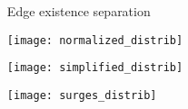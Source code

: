 \documentclass[final]{beamer}
\newlength{\onecolwid}
\newlength{\twocolwid}
\begin{document}
\begin{frame}[t]
\begin{columns}[t]
\begin{column}{\twocolwid}
\begin{columns}[t,totalwidth=\twocolwid]
\begin{column}{\onecolwid}
\end{column} %

\begin{column}{\onecolwid}\vspace{-.6in} %


\begin{block}{Edge existence separation}
\begin{center}
  \texttt{[image: normalized\_distrib]}
\end{center}
\begin{center}
  \texttt{[image: simplified\_distrib]}
\end{center}
\begin{center}
  \texttt{[image: surges\_distrib]}
\end{center}


\end{block}


\end{column} %

\end{columns} %






\begin{columns}[t,totalwidth=\twocolwid] %


\end{columns}
\end{column}
\end{columns}
\end{frame}
\end{document}
